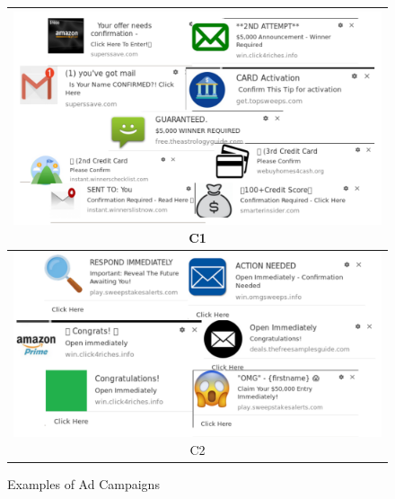 \begin{figure}[ht]
\caption{Examples of Ad Campaigns }
\begin{center}
\label{text_cluster}
\begin{tabular}{c}
\hline


 \includegraphics[scale=0.28]{figs/notifications.pdf}{C1}

\\
\hline
\hline

 \includegraphics[scale=0.28]{figs/notifications2.pdf}{C2}

 \\
 \hline
    \end{tabular}
\label{tab1}
\end{center}
\end{figure}
